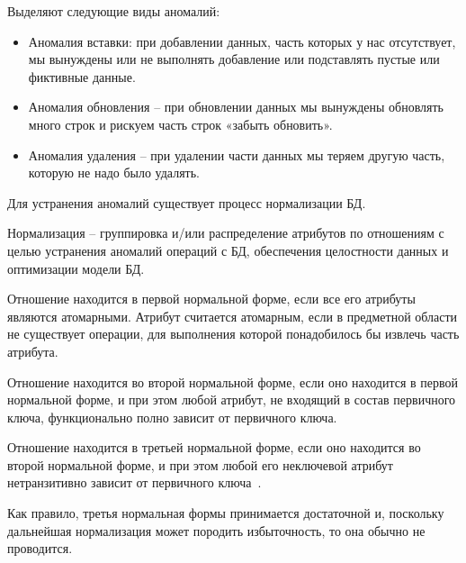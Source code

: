 Выделяют следующие виды аномалий:
\begin{itemize}
	\item Аномалия вставки: при добавлении данных, часть которых у нас отсутствует, мы вынуждены или не выполнять
	добавление или подставлять пустые или фиктивные данные.
	\item Аномалия обновления – при обновлении данных мы вынуждены обновлять много строк и рискуем часть строк
	«забыть обновить».
	\item Аномалия удаления – при удалении части данных мы теряем другую часть, которую не надо было удалять.
\end{itemize}

Для устранения аномалий существует процесс нормализации БД.

Нормализация -- группировка и/или распределение атрибутов по отношениям с целью устранения аномалий операций с БД,
обеспечения целостности данных и оптимизации модели БД.

Отношение находится в первой нормальной форме, если все его атрибуты являются атомарными. Атрибут считается
атомарным, если в предметной области не существует операции, для выполнения которой понадобилось бы извлечь часть атрибута.

Отношение находится во второй нормальной форме, если оно находится в первой нормальной форме, и при этом любой атрибут,
не входящий в состав первичного ключа, функционально полно зависит от первичного ключа.

Отношение находится в третьей нормальной форме, если оно находится во второй нормальной форме, и при этом любой его
неключевой атрибут нетранзитивно зависит от первичного ключа~\cite{kulikov_db_workbook}.

Как правило, третья нормальная формы принимается достаточной и, поскольку дальнейшая нормализация может породить
избыточность, то она обычно не проводится.


